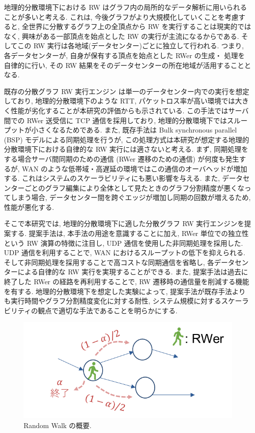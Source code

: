 地理的分散環境下における RW はグラフ内の局所的なデータ解析に用いられることが多いと考える. これは, 今後グラフがより大規模化していくことを考慮すると, 全世界に分散するグラフ上の全頂点から RW を実行することは現実的ではなく, 興味がある一部頂点を始点とした RW の実行が主流になるからである. そしてこの RW 実行は各地域(データセンター)ごとに独立して行われる. つまり, 各データセンターが, 自身が保有する頂点を始点とした RWer の生成・ 処理を自律的に行い, その RW 結果をそのデータセンターの所在地域が活用することとなる. 

既存の分散グラフ RW 実行エンジン \cite{10.1145/3341301.3359634} は単一のデータセンター内での実行を想定しており, 地理的分散環境下のような RTT, パケットロス率が高い環境では大きく性能が劣化することが本研究の評価からも示されている. この手法ではサーバ間での RWer 送受信に TCP 通信を採用しており, 地理的分散環境下ではスループットが小さくなるためである. また, 既存手法は Bulk synchronous parallel (BSP) モデルによる同期処理を行うが, この処理方式は本研究が想定する地理的分散環境下における自律的な RW 実行には適さないと考える. まず, 同期処理をする場合サーバ間同期のための通信 (RWer 遷移のための通信) が何度も発生するが, WAN のような低帯域・高遅延の環境ではこの通信のオーバヘッドが増加する. これはシステムのスケーラビリティにも悪い影響を与える. また, データセンターごとのグラフ編集により全体として見たときのグラフ分割精度が悪くなってしまう場合, データセンター間を跨ぐエッジが増加し同期の回数が増えるため, 性能が悪化する. 

そこで本研究では, 地理的分散環境下に適した分散グラフ RW 実行エンジンを提案する. 提案手法は, 本手法の用途を意識することに加え, RWer 単位での独立性という RW 演算の特徴に注目し, UDP 通信を使用した非同期処理を採用した. UDP 通信を利用することで, WAN におけるスループットの低下を抑えられる. そして非同期処理を採用することで高コストな同期通信を省略し, 各データセンターによる自律的な RW 実行を実現することができる. また, 提案手法は過去に終了した RWer の経路を再利用することで, RW 遷移時の通信量を削減する機能を有する. 地理的分散環境下を想定した実験によって, 提案手法が既存手法よりも実行時間やグラフ分割精度変化に対する耐性, システム規模に対するスケーラビリティの観点で適切な手法であることを明らかにする. 

\begin{figure}[t]
    \centering
    \includegraphics[scale=1.0]{figure/RandomWalk.pdf}
    \caption{Random Walk の概要.}
    \label{Random Walk の概要}
\end{figure}

